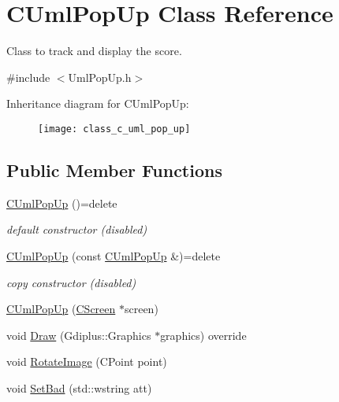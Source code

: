 \hypertarget{class_c_uml_pop_up}{}\section{C\+Uml\+Pop\+Up Class Reference}
\label{class_c_uml_pop_up}


Class to track and display the score.  




{\ttfamily \#include $<$Uml\+Pop\+Up.\+h$>$}

Inheritance diagram for C\+Uml\+Pop\+Up\+:\begin{figure}[H]
\begin{center}
\leavevmode
\texttt{[image: class\_c\_uml\_pop\_up]}
\end{center}
\end{figure}
\subsection*{Public Member Functions}
\begin{DoxyCompactItemize}
\item 
\mbox{\label{class_c_uml_pop_up_aebfa4131b157471dd72bd8cf33c79f39}} 
\mbox{\hyperlink{class_c_uml_pop_up_aebfa4131b157471dd72bd8cf33c79f39}{C\+Uml\+Pop\+Up}} ()=delete
\begin{DoxyCompactList}\small\item\em default constructor (disabled) \end{DoxyCompactList}\item 
\mbox{\label{class_c_uml_pop_up_aff6813da1336a5f829f357282008ed98}} 
\mbox{\hyperlink{class_c_uml_pop_up_aff6813da1336a5f829f357282008ed98}{C\+Uml\+Pop\+Up}} (const \mbox{\hyperlink{class_c_uml_pop_up}{C\+Uml\+Pop\+Up}} \&)=delete
\begin{DoxyCompactList}\small\item\em copy constructor (disabled) \end{DoxyCompactList}\item 
\mbox{\hyperlink{class_c_uml_pop_up_a7bebcefec4897b52e2dda3095bb807b5}{C\+Uml\+Pop\+Up}} (\mbox{\hyperlink{class_c_screen}{C\+Screen}} $\ast$screen)
\item 
void \mbox{\hyperlink{class_c_uml_pop_up_ab9dc4616dc8b7529a69d74a9db83b3a9}{Draw}} (Gdiplus\+::\+Graphics $\ast$graphics) override
\item 
void \mbox{\hyperlink{class_c_uml_pop_up_a71d5c02b32a372120c438a2e607b1bae}{Rotate\+Image}} (C\+Point point)
\item 
void \mbox{\hyperlink{class_c_uml_pop_up_a787be205186fbccdb9c2e8c1921ab071}{Set\+Bad}} (std\+::wstring att)
\end{DoxyCompactItemize}
